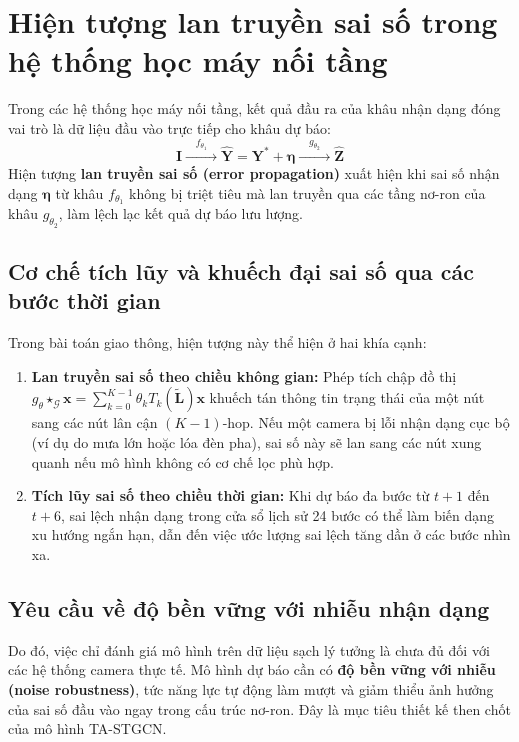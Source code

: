 \section{Hiện tượng lan truyền sai số trong hệ thống học máy nối tầng}
Trong các hệ thống học máy nối tầng, kết quả đầu ra của khâu nhận dạng đóng vai trò là dữ liệu đầu vào trực tiếp cho khâu dự báo:
\begin{equation}
    \mathbf{I} \xrightarrow{\quad f_{\theta_1} \quad} \hat{\mathbf{Y}} = \mathbf{Y}^* + \boldsymbol{\eta} \xrightarrow{\quad g_{\theta_2} \quad} \hat{\mathbf{Z}}
\end{equation}
Hiện tượng \textbf{lan truyền sai số (error propagation)} xuất hiện khi sai số nhận dạng $\boldsymbol{\eta}$ từ khâu $f_{\theta_1}$ không bị triệt tiêu mà lan truyền qua các tầng nơ-ron của khâu $g_{\theta_2}$, làm lệch lạc kết quả dự báo lưu lượng.

\subsection{Cơ chế tích lũy và khuếch đại sai số qua các bước thời gian}
Trong bài toán giao thông, hiện tượng này thể hiện ở hai khía cạnh:
\begin{enumerate}
    \item \textbf{Lan truyền sai số theo chiều không gian:} Phép tích chập đồ thị $g_\theta \star_{\mathcal{G}} \mathbf{x} = \sum_{k=0}^{K-1} \theta_k T_k(\tilde{\mathbf{L}}) \mathbf{x}$ khuếch tán thông tin trạng thái của một nút sang các nút lân cận $(K-1)$-hop. Nếu một camera bị lỗi nhận dạng cục bộ (ví dụ do mưa lớn hoặc lóa đèn pha), sai số này sẽ lan sang các nút xung quanh nếu mô hình không có cơ chế lọc phù hợp.
    \item \textbf{Tích lũy sai số theo chiều thời gian:} Khi dự báo đa bước từ $t+1$ đến $t+6$, sai lệch nhận dạng trong cửa sổ lịch sử 24 bước có thể làm biến dạng xu hướng ngắn hạn, dẫn đến việc ước lượng sai lệch tăng dần ở các bước nhìn xa.
\end{enumerate}

\subsection{Yêu cầu về độ bền vững với nhiễu nhận dạng}
Do đó, việc chỉ đánh giá mô hình trên dữ liệu sạch lý tưởng là chưa đủ đối với các hệ thống camera thực tế. Mô hình dự báo cần có \textbf{độ bền vững với nhiễu (noise robustness)}, tức năng lực tự động làm mượt và giảm thiểu ảnh hưởng của sai số đầu vào ngay trong cấu trúc nơ-ron. Đây là mục tiêu thiết kế then chốt của mô hình TA-STGCN.

